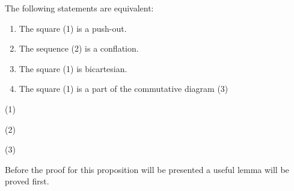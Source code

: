     \begin{prop} 
        The following statements are equivalent:
        \begin{enumerate}
            \item The square (1) is a push-out.
            \item The sequence (2) is a conflation.
            \item The square (1) is bicartesian.
            \item The square (1) is a part of the commutative diagram (3)
        \end{enumerate}
        \begin{center}
            (1)
            \space (2)
            \space (3)
        \end{center}
    \end{prop}

    Before the proof for this proposition will be presented a useful lemma will be proved first.

